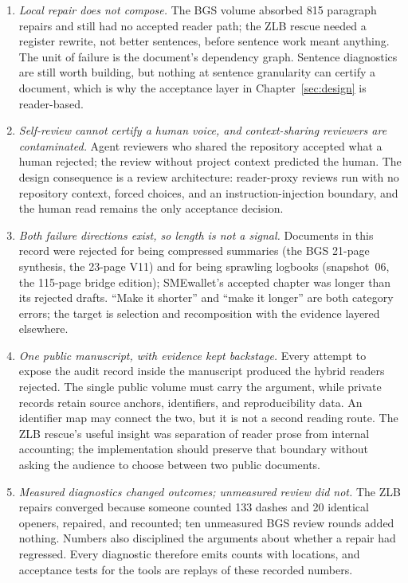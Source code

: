 \begin{enumerate}
\item \emph{Local repair does not compose.} The BGS volume absorbed 815
paragraph repairs and still had no accepted reader path; the ZLB rescue
needed a register rewrite, not better sentences, before sentence work meant
anything. The unit of failure is the document's dependency graph. Sentence
diagnostics are still worth building, but nothing at sentence granularity can
certify a document, which is why the acceptance layer in
Chapter~\ref{sec:design} is reader-based.

\item \emph{Self-review cannot certify a human voice, and context-sharing
reviewers are contaminated.} Agent reviewers who shared the repository
accepted what a human rejected; the review without project context predicted
the human. The design consequence is a review architecture: reader-proxy
reviews run with no repository context, forced choices, and an
instruction-injection boundary, and the human read remains the only
acceptance decision.

\item \emph{Both failure directions exist, so length is not a signal.}
Documents in this record were rejected for being compressed summaries (the
BGS 21-page synthesis, the 23-page V11) and for being sprawling logbooks
(snapshot~06, the 115-page bridge edition); SMEwallet's accepted chapter was
longer than its rejected drafts. ``Make it shorter'' and ``make it longer''
are both category errors; the target is selection and recomposition with the
evidence layered elsewhere.

\item \emph{One public manuscript, with evidence kept backstage.} Every
attempt to expose the audit record inside the manuscript produced the hybrid
readers rejected. The single public volume must carry the argument, while
private records retain source anchors, identifiers, and reproducibility data.
An identifier map may connect the two, but it is not a second reading route.
The ZLB rescue's useful insight was separation of reader prose from internal
accounting; the implementation should preserve that boundary without asking
the audience to choose between two public documents.

\item \emph{Measured diagnostics changed outcomes; unmeasured review did
not.} The ZLB repairs converged because someone counted 133 dashes and 20
identical openers, repaired, and recounted; ten unmeasured BGS review rounds
added nothing. Numbers also disciplined the arguments about whether a repair
had regressed. Every \hv{} diagnostic therefore emits counts with locations,
and acceptance tests for the tools are replays of these recorded numbers.


\end{enumerate}
